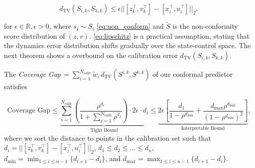 \documentclass{l4dc2026}
\newcommand{\tvd}{d_\textrm{TV}}
\newcommand{\T}{^\top}
\begin{document}
\vspace{-10pt}
\begin{equation}\label{eq:lipschitz}
\tvd( S_{i,k},S_{k,k}) \leq  \epsilon ||[z_k\T,v_k\T] - [x_i\T,u_i\T]||_{2},    
\end{equation}
\vspace{-13pt}

\noindent for $\epsilon \in \mathbb{R}, \epsilon > 0$, where $s_i \sim S_i$ \eqref{eq:non_conform} and $\tilde{S}$ is the non-conformity score distribution of $(z,v)$. 
\eqref{eq:lipschitz} is a practical assumption, stating that the dynamics error distribution shifts gradually over the state-control space. 
The next theorem shows a overbound on the calibration error $\tvd(S_{i,k},S_{k,k})$.
\vspace{-8pt}
\begin{theorem}\label{thm:cov_gap_thm} The \textit{Coverage Gap}$\,=\sum_{i=1}^{N_\textrm{calib}}\tilde{w}_i\,\tvd(S^{i,k}, S^{k,k})$ of our conformal predictor satisfies

\vspace{-10pt}
\begin{equation}\textstyle
    \text{Coverage Gap}\le \underbrace{\textstyle\sum_{i=1}^{N_\textrm{calib}} \left( \frac{\rho^{d_i}}{1 + \sum_{j=1}^{N_\textrm{calib}} \rho^{d_j}} \right) \cdot 2\epsilon \cdot d_i}_{\text{Tight Bound}} \le \underbrace{\textstyle 2 \epsilon \left[  \frac{d_1 }{1 - \rho^{d_\text{min}}} + \frac{d_\text{max}\rho^{d_\text{min}}}{(1-\rho^{d_\text{min}})^2}\right]}_{\text{Interpretable Bound}}, 
\label{eq:thm3_bound}\end{equation}
where we sort the distance to points in the calibration set such that $d_i = ||[z_k\T,v_k\T] - [x_i\T,u_i\T]||_{2}$, $d_1 \le d_2 \le \dots \le d_n$, $d_\text{min} = \min_{1 \leq i \leq n-1}\{d_{i+1} - d_i\}$, and $d_\text{max} = \max_{1 \leq i \leq n-1} \{ d_{i+1} - d_i\}$.
\end{theorem}
\vspace{-2pt}
\end{document}
